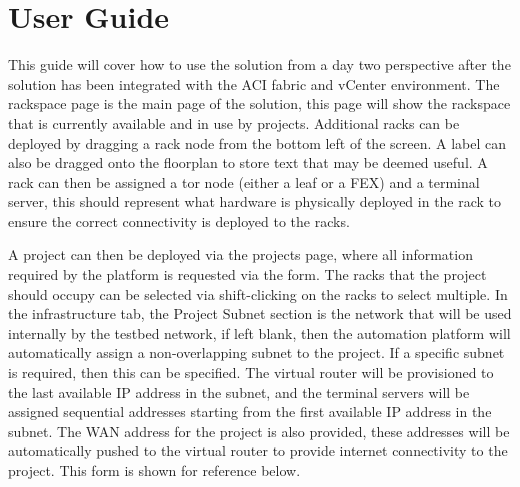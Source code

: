 \chapter{User Guide}
\label{chap:appendix-e}
This guide will cover how to use the solution from a day two perspective after the solution has been integrated with the ACI fabric and vCenter environment.
The rackspace page is the main page of the solution, this page will show the rackspace that is currently available and in use by projects. Additional racks can be deployed by dragging a rack node from the bottom left of the screen. A label can also be dragged onto the floorplan to store text that may be deemed useful. A rack can then be assigned a \gls{tor} node (either a leaf or a FEX) and a terminal server, this should represent what hardware is physically deployed in the rack to ensure the correct connectivity is deployed to the racks.

A project can then be deployed via the projects page, where all information required by the platform is requested via the form. The racks that the project should occupy can be selected via shift-clicking on the racks to select multiple. In the infrastructure tab, the Project Subnet section is the network that will be used internally by the testbed network, if left blank, then the automation platform will automatically assign a non-overlapping subnet to the project. If a specific subnet is required, then this can be specified. The virtual router will be provisioned to the last available IP address in the subnet, and the terminal servers will be assigned sequential addresses starting from the first available IP address in the subnet. The WAN address for the project is also provided, these addresses will be automatically pushed to the virtual router to provide internet connectivity to the project. This form is shown for reference below.

